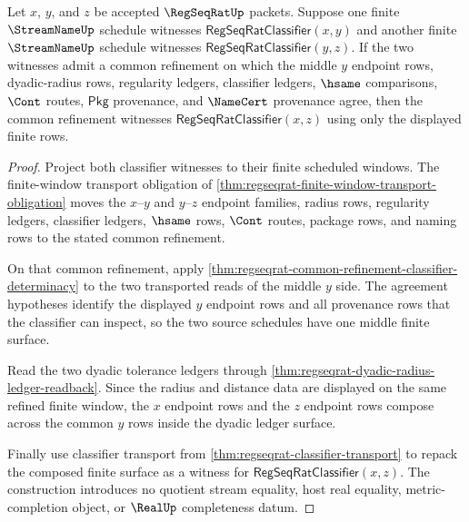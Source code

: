 \begin{theorem}
\label{thm:regseqrat-classifier-common-refinement-transitivity}
Let $x$, $y$, and $z$ be accepted $\RegSeqRatUp$ packets. Suppose one finite $\StreamNameUp$ schedule witnesses $\mathsf{RegSeqRatClassifier}(x,y)$ and another finite $\StreamNameUp$ schedule witnesses $\mathsf{RegSeqRatClassifier}(y,z)$. If the two witnesses admit a common refinement on which the middle $y$ endpoint rows, dyadic-radius rows, regularity ledgers, classifier ledgers, $\hsame$ comparisons, $\Cont$ routes, $\mathsf{Pkg}$ provenance, and $\NameCert$ provenance agree, then the common refinement witnesses $\mathsf{RegSeqRatClassifier}(x,z)$ using only the displayed finite rows.
\end{theorem}
\begin{proof}
Project both classifier witnesses to their finite scheduled windows. The finite-window transport obligation of \autoref{thm:regseqrat-finite-window-transport-obligation} moves the $x$--$y$ and $y$--$z$ endpoint families, radius rows, regularity ledgers, classifier ledgers, $\hsame$ rows, $\Cont$ routes, package rows, and naming rows to the stated common refinement.

On that common refinement, apply \autoref{thm:regseqrat-common-refinement-classifier-determinacy} to the two transported reads of the middle $y$ side. The agreement hypotheses identify the displayed $y$ endpoint rows and all provenance rows that the classifier can inspect, so the two source schedules have one middle finite surface.

Read the two dyadic tolerance ledgers through \autoref{thm:regseqrat-dyadic-radius-ledger-readback}. Since the radius and distance data are displayed on the same refined finite window, the $x$ endpoint rows and the $z$ endpoint rows compose across the common $y$ rows inside the dyadic ledger surface.

Finally use classifier transport from \autoref{thm:regseqrat-classifier-transport} to repack the composed finite surface as a witness for $\mathsf{RegSeqRatClassifier}(x,z)$. The construction introduces no quotient stream equality, host real equality, metric-completion object, or $\RealUp$ completeness datum.
\end{proof}


